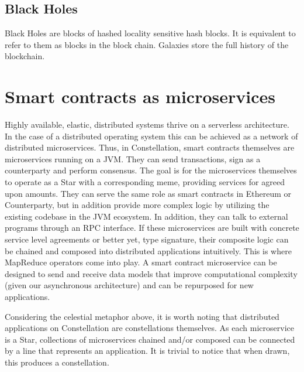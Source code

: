 \documentclass{article}
\begin{document}
\subsection{Black Holes}
Black Holes are blocks of hashed locality sensitive hash blocks. It is equivalent to refer to them as blocks in the block chain. Galaxies store the full history of the blockchain.

\section{Smart contracts as microservices}
Highly available, elastic, distributed systems thrive on a serverless architecture. In the case of a distributed operating system this can be achieved as a network of distributed microservices. Thus, in Constellation, smart contracts themselves are microservices running on a JVM. They can send transactions, sign as a counterparty and perform consensus. The goal is for the microservices themselves to operate as a Star with a corresponding meme, providing services for agreed upon amounts. They can serve the same role as smart contracts in Ethereum or Counterparty, but in addition provide more complex logic by utilizing the existing codebase in the JVM ecosystem. In addition, they can talk to external programs through an RPC interface. If these microservices are built with concrete service level agreements or better yet, type signature, their composite logic can be chained and composed into distributed applications intuitively. This is where MapReduce operators come into play. A smart contract microservice can be designed to send and receive data models that improve computational complexity (given our asynchronous architecture) and can be repurposed for new applications.

Considering the celestial metaphor above, it is worth noting that distributed applications on Constellation are constellations themselves. As each microservice is a  Star, collections of microservices chained and/or composed can be connected by a line that represents an application. It is trivial to notice that when drawn, this produces a constellation.
\end{document}
